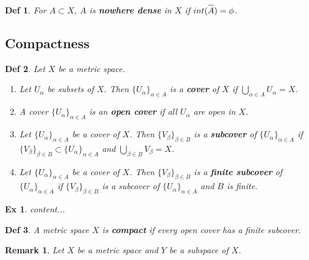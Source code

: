 \documentclass[paper=a4, fontsize=11pt]{scrartcl}
\newcommand{\overbar}[1]{
	\mkern 1.5mu \overline{\mkern-1.5mu\raisebox{0pt}[\dimexpr\height+0.5mm\relax]{$#1$}\mkern-1.5mu}\mkern 1.5mu
}
\newtheorem{definition}{Def}
\newtheorem{example}{Ex}
\newtheorem*{remark}{Remark}
\begin{document}
\begin{definition}
	For $A \subset X$, $A$ is \textbf{nowhere dense} in $X$ if $int(\overbar{A})=\phi$.
\end{definition}

\vspace{0.15in}
\subsection{Compactness}
\vspace{0.15in}

\begin{definition}
	Let $X$ be a metric space.
	\begin{enumerate}[label=\arabic*)]
		\item Let $U_\alpha$ be subsets of $X$. Then $\{ U_\alpha \}_{\alpha \in A}$ is a \textbf{cover} of $X$ if $\bigcup\limits_{\alpha \in A} U_\alpha = X$.
		\item A cover $\{ U_\alpha \}_{\alpha \in A}$ is an \textbf{open cover} if all $U_\alpha$ are open in $X$.
		\item Let $\{U_\alpha \}_{\alpha \in A}$ be a cover of $X$. Then $\{ V_\beta \}_{\beta \in B}$ is a \textbf{subcover} of $\{U_\alpha \}_{\alpha \in A}$ if $\{ V_\beta \}_{\beta \in B} \subset \{U_\alpha \}_{\alpha \in A}$ and $\bigcup\limits_{\beta \in B} V_\beta = X$.
		\item Let $\{U_\alpha \}_{\alpha \in A}$ be a cover of $X$. Then $\{ V_\beta \}_{\beta \in B}$ is a \textbf{finite subcover} of $\{U_\alpha \}_{\alpha \in A}$ if $\{ V_\beta \}_{\beta \in B}$ is a subcover of $\{U_\alpha \}_{\alpha \in A}$ and $B$ is finite. \\
	\end{enumerate}
\end{definition}

\begin{example}
	content...\\
\end{example}

\begin{definition}
	A metric space $X$ is \textbf{compact} if every open cover has a finite subcover.\\
\end{definition}

\begin{remark}
	Let $X$ be a metric space and $Y$ be a subspace of $X$.\\
\end{remark}
\end{document}
